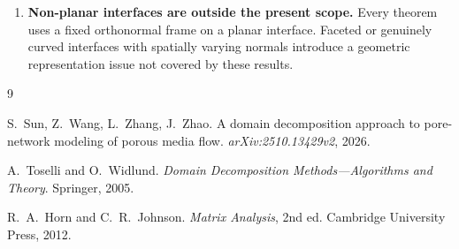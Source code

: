 \documentclass[11pt,a4paper]{article}
\theoremstyle{definition}
\begin{document}
\begin{enumerate}[leftmargin=*,itemsep=4pt]
  \item \textbf{Non-planar interfaces are outside the present scope.}
    Every theorem uses a fixed orthonormal frame on a planar interface.
    Faceted or genuinely curved interfaces with spatially varying
    normals introduce a geometric representation issue not covered by
    these results.
\end{enumerate}

\begin{thebibliography}{9}

S.~Sun, Z.~Wang, L.~Zhang, J.~Zhao.
\newblock A domain decomposition approach to pore-network modeling of porous
  media flow.
\newblock \textit{arXiv:2510.13429v2}, 2026.

A.~Toselli and O.~Widlund.
\newblock \textit{Domain Decomposition Methods---Algorithms and Theory}.
\newblock Springer, 2005.

R.~A.~Horn and C.~R.~Johnson.
\newblock \textit{Matrix Analysis}, 2nd ed.
\newblock Cambridge University Press, 2012.

\end{thebibliography}
\end{document}
